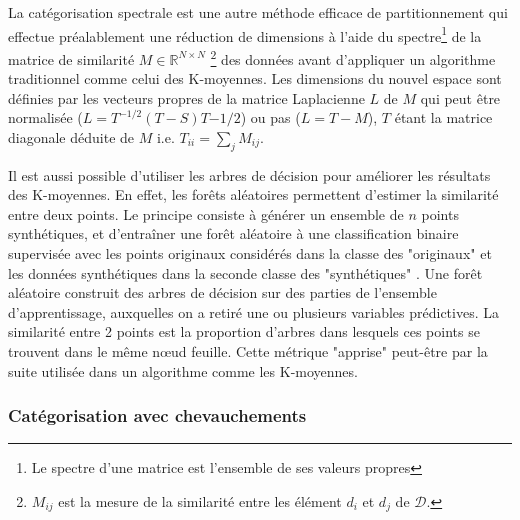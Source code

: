 La catégorisation spectrale est une autre méthode efficace de partitionnement qui effectue préalablement une réduction de dimensions à l'aide du spectre\footnote{Le spectre d'une matrice est l'ensemble de ses valeurs propres} de la matrice de similarité $M \in \mathbb{R}^{N \times N}$ \footnote{$M_{ij}$ est la mesure de la similarité entre les élément $d_i$ et $d_j$ de $\mathcal{D}$.} des données  avant d'appliquer un algorithme traditionnel comme celui des K-moyennes. Les dimensions du nouvel espace sont définies par les vecteurs propres de la matrice Laplacienne $L$ de $M$ \citep{shi2000spectralClustering, von2007tutorialSpectralClustering} qui peut être normalisée ($L = T^{-1/2}(T-S)T{-1/2}$) ou pas ($L = T - M$), $T$ étant la matrice diagonale déduite de $M$ i.e. $T_{ii} = \sum\limits_j M_{ij}$. 

Il est aussi possible d'utiliser les arbres de décision pour améliorer les résultats des K-moyennes. En effet, les forêts aléatoires \citep{breiman2001randomforest} permettent d'estimer la similarité entre deux points. Le principe consiste à générer un ensemble de $n$ points synthétiques, et d'entraîner une forêt aléatoire à une classification binaire supervisée avec les points originaux considérés dans la classe des "originaux" et les données synthétiques dans la seconde classe des "synthétiques" \citep{afanador2016unsupervisedrandomforest}. %
Une forêt aléatoire construit des arbres de décision sur des parties de l'ensemble d'apprentissage, auxquelles on a retiré une ou plusieurs variables prédictives. La similarité entre 2 points est la proportion d'arbres dans lesquels ces points se trouvent dans le même nœud feuille. Cette métrique "apprise" peut-être par la suite utilisée dans un algorithme comme les K-moyennes.



\subsubsection{Catégorisation avec chevauchements}

